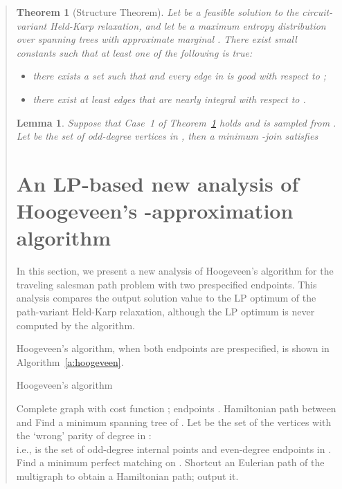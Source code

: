 \documentclass[11pt,letterpaper]{article}
\newtheorem{lemma}{Lemma}
\newtheorem{thm}{Theorem}
\begin{document}
\begin{quote}
\begin{thm}[Structure Theorem]
\label{t:structure}
Let  be a feasible solution to the circuit-variant Held-Karp relaxation, and let  be a maximum entropy distribution over spanning trees with approximate marginal . There exist small constants  such that at least one of the following is true:\begin{itemize}
\item[1.] there exists a set  such that  and every edge in  is good with respect to ;
\item[2.] there exist at least  edges that are nearly integral with respect to .
\end{itemize}
\end{thm}

\begin{lemma}
\label{l:case1}
Suppose that Case~1 of Theorem~\ref{t:structure} holds and  is sampled from . Let  be the set of odd-degree vertices in , then a minimum -join  satisfies
\end{lemma}

\section{An LP-based new analysis of Hoogeveen's -approximation algorithm}\label{s:5over3}

In this section, we present a new analysis of Hoogeveen's algorithm for the traveling salesman path problem with two prespecified endpoints. This analysis compares the output solution value to the LP optimum of the path-variant Held-Karp relaxation, although the LP optimum is never computed by the algorithm.

Hoogeveen's algorithm, when both endpoints are prespecified, is shown in Algorithm~\ref{a:hoogeveen}.

\begin{algorithm}[H]
\caption{Hoogeveen's algorithm \cite{H}}
\label{a:hoogeveen}
\begin{algorithmic}[1]
	\REQUIRE Complete graph  with cost function ; endpoints .
	\ENSURE Hamiltonian path between  and 
	\STATE Find a minimum spanning tree  of .
	\STATE Let  be the set of the vertices with the `wrong' parity of degree in :\\i.e.,  is the set of odd-degree internal points and even-degree endpoints in .
	\STATE Find a minimum perfect matching  on .
	\STATE Shortcut an Eulerian path of the multigraph  to obtain a Hamiltonian path; output it.
\end{algorithmic}
\end{algorithm}


\end{quote}
\end{document}
